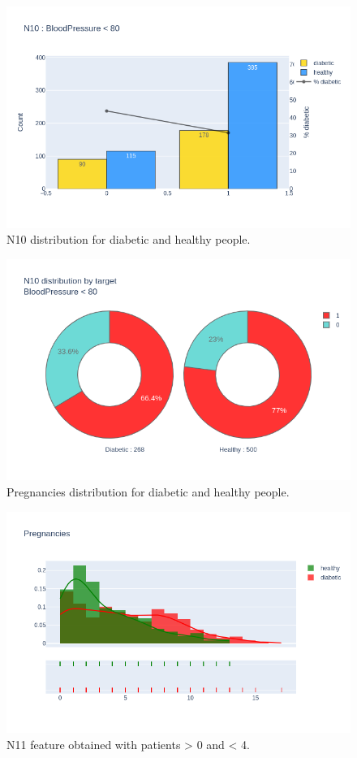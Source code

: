 \documentclass[12pt]{article}
\begin{document}
\begin{figure}[ht]
\centering
\includegraphics[width=1\textwidth]{newplot(34).png}
\caption{N10 distribution for diabetic and healthy people.}
\end{figure}

\begin{figure}[ht]
\centering
\includegraphics[width=1\textwidth]{newplot(35).png}
\caption{Pregnancies distribution for diabetic and healthy people.}
\end{figure}

\begin{figure}[ht]
\centering
\includegraphics[width=1\textwidth]{newplot(36).png}
\caption{N11 feature obtained with patients > 0 and < 4.}
\end{figure}
\end{document}

